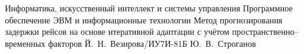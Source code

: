\documentclass{bmstu}
\begin{document}
    \makethesistitle
    {Информатика, искусственный интеллект и системы управления} %
    {Программное обеспечение ЭВМ и информационные технологии} %
    {Метод прогнозирования задержки рейсов на основе итеративной адаптации с учётом пространственно--временных факторов} %
    {Й.~Н.~Везирова/ИУ7И-81Б} %
    {Ю.~В.~Строганов} %
    {} %
    {} %

    \setcounter{page}{3}

%    

%    

    \maketableofcontents

%    
%    

    
    
%    
%    
%    
%    

    \makebibliography

%    

%    
\end{document}
